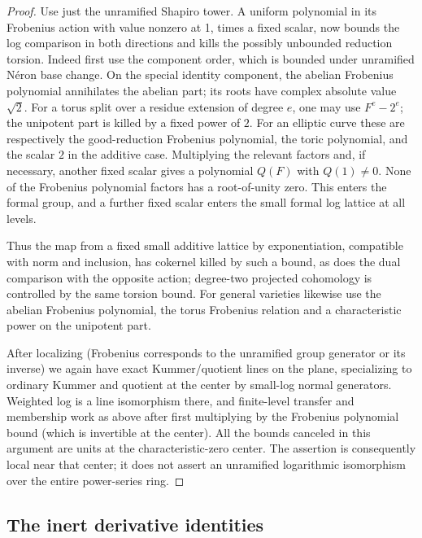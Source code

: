 \begin{proof}
Use just the unramified Shapiro tower. A uniform polynomial in its Frobenius action with value nonzero at 1, times a fixed scalar, now bounds the log comparison in both directions and kills the possibly unbounded reduction torsion. Indeed first use the component order, which is bounded under unramified Néron base change. On the special identity component, the abelian Frobenius polynomial annihilates the abelian part; its roots have complex absolute value \(\sqrt2\). For a torus split over a residue extension of degree \(e\), one may use \(F^e-2^e\); the unipotent part is killed by a fixed power of \(2\). For an elliptic curve these are respectively the good-reduction Frobenius polynomial, the toric polynomial, and the scalar \(2\) in the additive case. Multiplying the relevant factors and, if necessary, another fixed scalar gives a polynomial \(Q(F)\) with \(Q(1)\ne0\). None of the Frobenius polynomial factors has a root-of-unity zero. This enters the formal group, and a further fixed scalar enters the small formal log lattice at all levels.

Thus the map from a fixed small additive lattice by exponentiation, compatible with norm and inclusion, has cokernel killed by such a bound, as does the dual comparison with the opposite action; degree-two projected cohomology is controlled by the same torsion bound. For general varieties likewise use the abelian Frobenius polynomial, the torus Frobenius relation and a characteristic power on the unipotent part.

After localizing (Frobenius corresponds to the unramified group generator or its inverse) we again have exact Kummer/quotient lines on the plane, specializing to ordinary Kummer and quotient at the center by small-log normal generators. Weighted log is a line isomorphism there, and finite-level transfer and membership work as above after first multiplying by the Frobenius polynomial bound (which is invertible at the center). All the bounds canceled in this argument are units at the characteristic-zero center. The assertion is consequently local near that center; it does not assert an unramified logarithmic isomorphism over the entire power-series ring.
\end{proof}


\subsection{The inert derivative identities}

